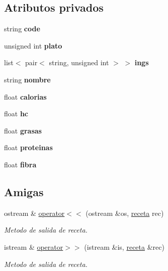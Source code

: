 \subsection*{Atributos privados}
\begin{DoxyCompactItemize}
\item 
\mbox{\label{classreceta_a02d2aa42c0b627de935429e8a53d1d9a}} 
string {\bfseries code}
\item 
\mbox{\label{classreceta_a7aecb46723811d4462dc59ed19abf40b}} 
unsigned int {\bfseries plato}
\item 
\mbox{\label{classreceta_ae7d631f134c14c4a22b7244762afb2b4}} 
list$<$ pair$<$ string, unsigned int $>$ $>$ {\bfseries ings}
\item 
\mbox{\label{classreceta_a2b5dfc20193e6b41cee2ac404e3a9b52}} 
string {\bfseries nombre}
\item 
\mbox{\label{classreceta_a7bf43ada8ca6add4b9ce2b21b133d573}} 
float {\bfseries calorias}
\item 
\mbox{\label{classreceta_ae16a3e544001b36016fd7d70df51b2e0}} 
float {\bfseries hc}
\item 
\mbox{\label{classreceta_ad4a370462b6f678c28a49b89590dcb8f}} 
float {\bfseries grasas}
\item 
\mbox{\label{classreceta_a4c6ff6fbb87e2db6ba147b6d3e0c4c60}} 
float {\bfseries proteinas}
\item 
\mbox{\label{classreceta_a376aa9d721943e6bc4b66c9163b29bc9}} 
float {\bfseries fibra}
\end{DoxyCompactItemize}
\subsection*{Amigas}
\begin{DoxyCompactItemize}
\item 
ostream \& \hyperlink{classreceta_a93def1190ead1b91d310359d61f831ff}{operator$<$$<$} (ostream \&os, \hyperlink{classreceta}{receta} rec)
\begin{DoxyCompactList}\small\item\em Metodo de salida de receta. \end{DoxyCompactList}\item 
istream \& \hyperlink{classreceta_a750ed3578c2a28e15b64bb9917420269}{operator$>$$>$} (istream \&is, \hyperlink{classreceta}{receta} \&rec)
\begin{DoxyCompactList}\small\item\em Metodo de salida de receta. \end{DoxyCompactList}\end{DoxyCompactItemize}


